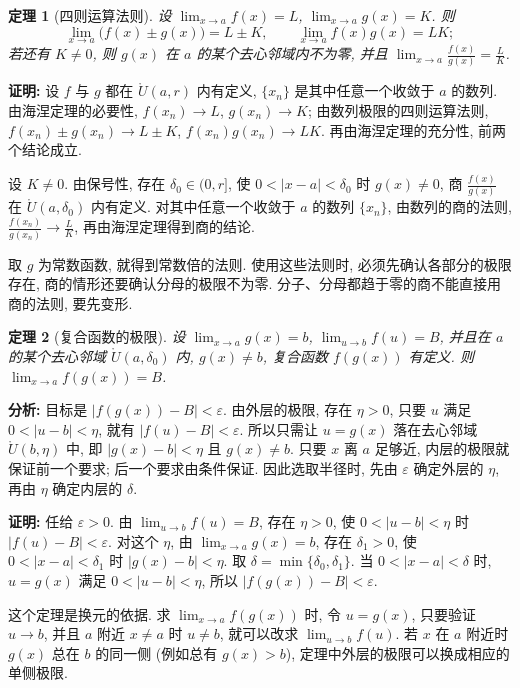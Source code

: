 \documentclass[UTF8,openany]{ctexbook}
\theoremstyle{chinesetextbook}
\newtheorem{theorem}{定理}[section]
\newenvironment{cnproof}{\par\indent\textbf{证明:} \ignorespaces}{\par}
\begin{document}
\begin{theorem}[四则运算法则]
设 $\displaystyle\lim_{x\to a}f(x)=L$, $\displaystyle\lim_{x\to a}g(x)=K$. 则
\[
\lim_{x\to a}\bigl(f(x)\pm g(x)\bigr)=L\pm K,\qquad\lim_{x\to a}f(x)g(x)=LK;
\]
若还有 $K\ne0$, 则 $g(x)$ 在 $a$ 的某个去心邻域内不为零, 并且 $\displaystyle\lim_{x\to a}\frac{f(x)}{g(x)}=\frac LK$.
\end{theorem}
\begin{cnproof}
设 $f$ 与 $g$ 都在 $\mathring U(a,r)$ 内有定义, $\{x_n\}$ 是其中任意一个收敛于 $a$ 的数列. 由海涅定理的必要性, $f(x_n)\to L$, $g(x_n)\to K$; 由数列极限的四则运算法则, $f(x_n)\pm g(x_n)\to L\pm K$, $f(x_n)g(x_n)\to LK$. 再由海涅定理的充分性, 前两个结论成立.

设 $K\ne0$. 由保号性, 存在 $\delta_0\in(0,r]$, 使 $0<|x-a|<\delta_0$ 时 $g(x)\ne0$, 商 $\displaystyle\frac{f(x)}{g(x)}$ 在 $\mathring U(a,\delta_0)$ 内有定义. 对其中任意一个收敛于 $a$ 的数列 $\{x_n\}$, 由数列的商的法则, $\displaystyle\frac{f(x_n)}{g(x_n)}\to\frac LK$, 再由海涅定理得到商的结论.
\end{cnproof}
取 $g$ 为常数函数, 就得到常数倍的法则. 使用这些法则时, 必须先确认各部分的极限存在, 商的情形还要确认分母的极限不为零. 分子、分母都趋于零的商不能直接用商的法则, 要先变形.
\begin{theorem}[复合函数的极限]
设 $\displaystyle\lim_{x\to a}g(x)=b$, $\displaystyle\lim_{u\to b}f(u)=B$, 并且在 $a$ 的某个去心邻域 $\mathring U(a,\delta_0)$ 内, $g(x)\ne b$, 复合函数 $f(g(x))$ 有定义. 则 $\displaystyle\lim_{x\to a}f(g(x))=B$.
\end{theorem}
\par\indent\textbf{分析:} 目标是 $|f(g(x))-B|<\varepsilon$. 由外层的极限, 存在 $\eta>0$, 只要 $u$ 满足 $0<|u-b|<\eta$, 就有 $|f(u)-B|<\varepsilon$. 所以只需让 $u=g(x)$ 落在去心邻域 $\mathring U(b,\eta)$ 中, 即 $|g(x)-b|<\eta$ 且 $g(x)\ne b$. 只要 $x$ 离 $a$ 足够近, 内层的极限就保证前一个要求; 后一个要求由条件保证. 因此选取半径时, 先由 $\varepsilon$ 确定外层的 $\eta$, 再由 $\eta$ 确定内层的 $\delta$.
\begin{cnproof}
任给 $\varepsilon>0$. 由 $\displaystyle\lim_{u\to b}f(u)=B$, 存在 $\eta>0$, 使 $0<|u-b|<\eta$ 时 $|f(u)-B|<\varepsilon$. 对这个 $\eta$, 由 $\displaystyle\lim_{x\to a}g(x)=b$, 存在 $\delta_1>0$, 使 $0<|x-a|<\delta_1$ 时 $|g(x)-b|<\eta$. 取 $\delta=\min\{\delta_0,\delta_1\}$. 当 $0<|x-a|<\delta$ 时, $u=g(x)$ 满足 $0<|u-b|<\eta$, 所以 $|f(g(x))-B|<\varepsilon$.
\end{cnproof}
这个定理是换元的依据. 求 $\displaystyle\lim_{x\to a}f(g(x))$ 时, 令 $u=g(x)$, 只要验证 $u\to b$, 并且 $a$ 附近 $x\ne a$ 时 $u\ne b$, 就可以改求 $\displaystyle\lim_{u\to b}f(u)$. 若 $x$ 在 $a$ 附近时 $g(x)$ 总在 $b$ 的同一侧 (例如总有 $g(x)>b$), 定理中外层的极限可以换成相应的单侧极限.
\end{document}
